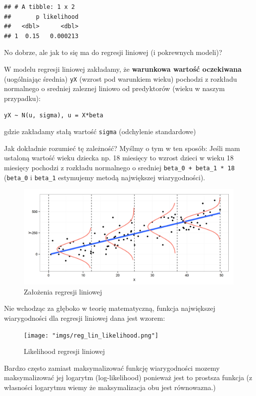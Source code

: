 \documentclass[
]{article}
\begin{document}
\begin{verbatim}
## # A tibble: 1 x 2
##       p likelihood
##   <dbl>      <dbl>
## 1  0.15   0.000213
\end{verbatim}

No dobrze, ale jak to się ma do regresji liniowej (i pokrewnych modeli)?

W modelu regresji liniowej zakładamy, że \textbf{warunkowa wartość
oczekiwana} (uogólniając średnia) \texttt{y\textbar{}X} (wzrost pod
warunkiem wieku) pochodzi z rozkładu normalnego o sredniej zaleznej
liniowo od predyktorów (wieku w naszym przypadku):

\texttt{y\textbar{}X\ \textasciitilde{}\ N(u,\ sigma),\ u\ =\ X*beta}

gdzie zakładamy stałą wartość \texttt{sigma} (odchylenie standardowe)

\newpage

Jak dokładnie rozumieć tę zależność? Myślmy o tym w ten sposób: Jeśli
mam ustaloną wartość wieku dziecka np. 18 miesięcy to wzrost dzieci w
wieku 18 miesięcy pochodzi z rozkładu normalnego o sredniej
\texttt{beta\_0\ +\ beta\_1\ *\ 18} (\texttt{beta\_0} i \texttt{beta\_1}
estymujemy metodą największej wiarygodności).

\begin{figure}
\centering
\includegraphics{"imgs/reg_lin.png"}
\caption{Założenia regresji liniowej}
\end{figure}

Nie wchodząc za głęboko w teorię matematyczną, funkcja największej
wiarygodności dla regresji liniowej dana jest wzorem:

\begin{figure}
\centering
\texttt{[image: "imgs/reg\_lin\_likelihood.png"]}
\caption{Likelihood regresji liniowej}
\end{figure}

Bardzo często zamiast maksymalizować funkcję wiarygodności mozemy
maksymalizować jej logarytm (log-likelihood) ponieważ jest to prostsza
funkcja (z własności logarytmu wiemy że maksymalizacja obu jest
równowazna.)
\end{document}
